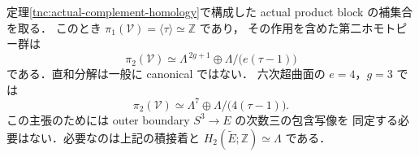 \begin{theorem}
\label{tnc:equivariant-pi2}
定理\ref{tnc:actual-complement-homology}で構成した actual product block の補集合を取る．
このとき $\pi_1(\mathcal V)=\langle\tau\rangle\simeq\mathbb Z$ であり，
その作用を含めた第二ホモトピー群は
\begin{equation}\label{tnc:eq:equivariant-pi2}
 \pi_2(\mathcal V)\simeq
 \Lambda^{\,2g+1}\oplus\Lambda/\bigl(e(\tau-1)\bigr)
\end{equation}
である．直和分解は一般に canonical ではない．
六次超曲面の $e=4$，$g=3$ では
\[
 \pi_2(\mathcal V)\simeq
 \Lambda^7\oplus\Lambda/\bigl(4(\tau-1)\bigr).
\]
この主張のためには outer boundary $S^3\to E$ の次数三の包含写像を
同定する必要はない．必要なのは上記の積接着と
$H_2(\widetilde E;\mathbb Z)\simeq\Lambda$ である．
\end{theorem}
